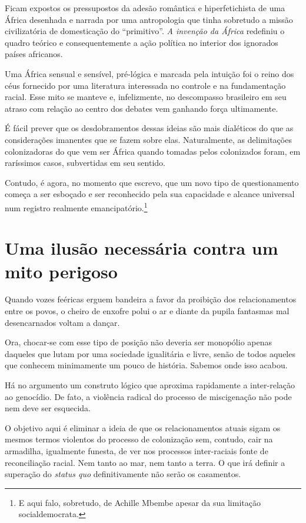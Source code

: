 Ficam expostos os pressupostos da adesão romântica e hiperfetichista de
uma África desenhada e narrada por uma antropologia que tinha sobretudo
a missão civilizatória de domesticação do ``primitivo''. \emph{A
invenção da África} redefiniu o quadro teórico e consequentemente a ação
política no interior dos ignorados países africanos.

Uma África sensual e sensível, pré-lógica e marcada pela intuição foi o
reino dos céus fornecido por uma literatura interessada no controle e na
fundamentação racial. Esse mito se manteve e, infelizmente, no
descompasso brasileiro em seu atraso com relação ao centro dos debates
vem ganhando força ultimamente.

É fácil prever que os desdobramentos dessas ideias são mais dialéticos
do que as considerações imanentes que se fazem sobre elas. Naturalmente,
as delimitações colonizadoras do que vem ser África quando tomadas pelos
colonizados foram, em raríssimos casos, subvertidas em seu sentido.

Contudo, é agora, no momento que escrevo, que um novo tipo de
questionamento começa a ser esboçado e ser reconhecido pela sua
capacidade e alcance universal num registro realmente
emancipatório.\footnote{E aqui falo, sobretudo, de Achille Mbembe apesar
  da sua limitação socialdemocrata.}

\chapter{Uma ilusão necessária contra um mito perigoso}

Quando vozes feéricas erguem bandeira a favor da proibição dos
relacionamentos entre os povos, o cheiro de enxofre polui o ar e diante
da pupila fantasmas mal desencarnados voltam a dançar.

Ora, chocar-se com esse tipo de posição não deveria ser monopólio apenas
daqueles que lutam por uma sociedade igualitária e livre, senão de todos
aqueles que conhecem minimamente um pouco de história. Sabemos onde isso
acabou.

Há no argumento um construto lógico que aproxima rapidamente a
inter-relação ao genocídio. De fato, a violência radical do processo de
miscigenação não pode nem deve ser esquecida.

O objetivo aqui é eliminar a ideia de que os relacionamentos atuais
sigam os mesmos termos violentos do processo de colonização sem,
contudo, cair na armadilha, igualmente funesta, de ver nos processos
inter-raciais fonte de reconciliação racial. Nem tanto ao mar, nem tanto
a terra. O que irá definir a superação do \emph{status quo}
definitivamente não serão os casamentos.

